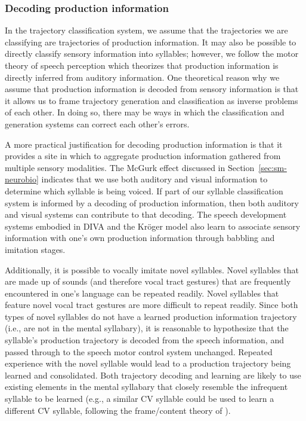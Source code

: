 \subsubsection{Decoding production information}

In the trajectory classification system,
we assume that the trajectories we are classifying
are trajectories of production information.
It may also be possible to directly classify
sensory information into syllables;
however, we follow the motor theory of speech perception
\citep{liberman1985}
which theorizes that production information
is directly inferred from auditory information.
One theoretical reason
why we assume that production information
is decoded from sensory information
is that it allows us
to frame trajectory generation and
classification as inverse problems
of each other.
In doing so, there may be ways
in which the classification and generation systems
can correct each other's errors.

A more practical justification
for decoding production information
is that it provides a site in which to
aggregate production information
gathered from multiple sensory modalities.
The McGurk effect discussed
in Section~\ref{sec:sm-neurobio}
indicates that we use both auditory
and visual information to
determine which syllable is being voiced.
If part of our syllable classification system
is informed by a decoding of production information,
then both auditory and visual systems
can contribute to that decoding.
The speech development systems
embodied in DIVA and the Kr\"{o}ger model
also learn to associate sensory information
with one's own production information
through babbling and imitation stages.

Additionally,
it is possible to vocally imitate
novel syllables.
Novel syllables that are made up of sounds
(and therefore vocal tract gestures)
that are frequently encountered
in one's language can be
repeated readily.
Novel syllables that feature
novel vocal tract gestures
are more difficult to repeat readily.
Since both types of novel syllables do not have
a learned production information trajectory
(i.e., are not in the mental syllabary),
it is reasonable to hypothesize that
the syllable's production trajectory
is decoded from the speech information,
and passed through to the
speech motor control system unchanged.
Repeated experience with the novel syllable
would lead to a production trajectory
being learned and consolidated.
Both trajectory decoding and
learning are likely
to use existing elements
in the mental syllabary
that closely resemble the
infrequent syllable to be learned
(e.g., a similar CV syllable could
be used to learn a different CV syllable,
following the frame/content theory
of \citet{macneilage2001}).

